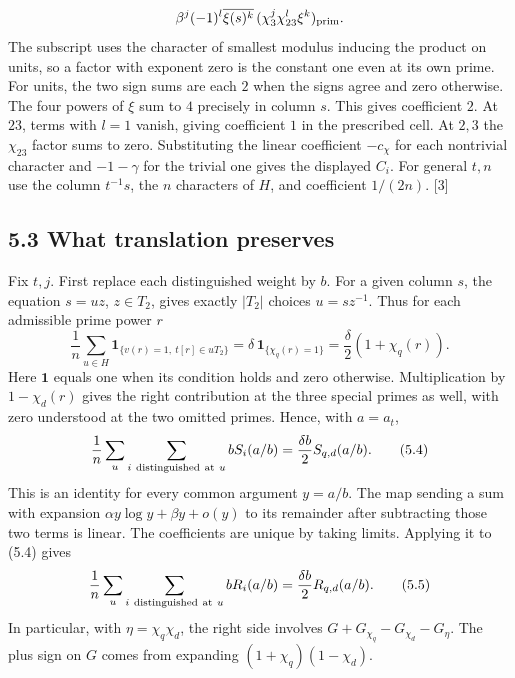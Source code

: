 \documentclass[11pt,letterpaper]{article}
\begin{document}
{\begin{equation}
 \beta^j(-1)^l\overline{\xi(s)^k}\,(\chi_3^j\chi_{23}^l\xi^k)_{\rm prim}.
\end{equation}
The subscript uses the character of smallest modulus inducing the product on units, so a factor with exponent zero is the constant one even at its own prime. For units, the two sign sums are each $2$ when the signs agree and zero otherwise. The four powers of $\xi$ sum to $4$ precisely in column $s$. This gives coefficient $2$. At $23$, terms with $l=1$ vanish, giving coefficient $1$ in the prescribed cell. At $2,3$ the $\chi_{23}$ factor sums to zero. Substituting the linear coefficient $-c_\chi$ for each nontrivial character and $-1-\gamma$ for the trivial one gives the displayed $C_i$. For general $t,n$ use the column $t^{-1}s$, the $n$ characters of $H$, and coefficient $1/(2n)$. [3]

\newpage
\subsection*{5.3 What translation preserves}

Fix $t,j$. First replace each distinguished weight by $b$. For a given column $s$, the equation $s=uz$, $z\in T_2$, gives exactly $|T_2|$ choices $u=sz^{-1}$. Thus for each admissible prime power $r$
\begin{equation}\label{D:67}
 \frac1n\sum_{u\in H}\mathbf1_{\{v(r)=1,\ t[r]\in uT_2\}}
   =\delta\,\mathbf1_{\{\chi_q(r)=1\}}
   =\frac{\delta}{2}(1+\chi_q(r)).
\end{equation}
Here $\mathbf1$ equals one when its condition holds and zero otherwise. Multiplication by $1-\chi_d(r)$ gives the right contribution at the three special primes as well, with zero understood at the two omitted primes. Hence, with $a=a_t$,
\begin{equation}\label{D:68}
 \frac1n\sum_u\sum_{i\ {\rm distinguished\ at}\ u} b S_i(a/b)
           =\frac{\delta b}{2}S_{q,d}(a/b).                       \tag{5.4}
\end{equation}
This is an identity for every common argument $y=a/b$. The map sending a sum with expansion $\alpha y\log y+\beta y+o(y)$ to its remainder after subtracting those two terms is linear. The coefficients are unique by taking limits. Applying it to (5.4) gives
\begin{equation}\label{D:69}
 \frac1n\sum_u\sum_{i\ {\rm distinguished\ at}\ u} b R_i(a/b)
            =\frac{\delta b}{2}R_{q,d}(a/b).                      \tag{5.5}
\end{equation}
In particular, with $\eta=\chi_q\chi_d$, the right side involves $G+G_{\chi_q}-G_{\chi_d}-G_\eta$. The plus sign on $G$ comes from expanding $(1+\chi_q)(1-\chi_d)$.

}
\end{document}
